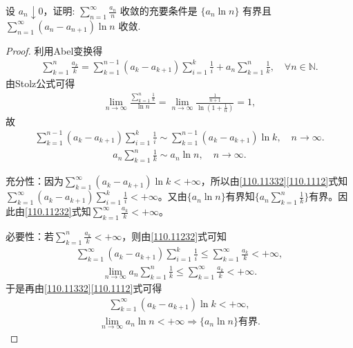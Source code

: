 \documentclass[../../main.tex]{subfiles}%
\begin{document}
\begin{example}
设 \( a_n \downarrow 0 \)，证明: \( \sum_{n=1}^{\infty} \frac{a_n}{n} \) 收敛的充要条件是 \( \{a_n \ln n\} \) 有界且 \( \sum_{n=1}^{\infty} (a_n - a_{n+1}) \ln n \) 收敛.
\end{example}
\begin{proof}
利用Abel变换得
\begin{align}
\sum_{k=1}^n{\frac{a_k}{k}}=\sum_{k=1}^{n-1}{\left( a_k-a_{k+1} \right) \sum_{i=1}^k{\frac{1}{i}}}+a_n\sum_{k=1}^n{\frac{1}{k}},\quad \forall n\in \mathbb{N} . \label{110.11232}
\end{align}
由Stolz公式可得
\begin{align*}
\lim_{n\rightarrow \infty}\frac{\sum\limits_{k=1}^n{\frac{1}{k}}}{\ln n}=\lim_{n\rightarrow \infty}\frac{\frac{1}{n+1}}{\ln \left( 1+\frac{1}{n} \right)}=1,
\end{align*}
故
\begin{align}
\sum_{k=1}^{n-1}{\left( a_k-a_{k+1} \right) \sum_{i=1}^k{\frac{1}{i}}}\sim \sum_{k=1}^{n-1}{\left( a_k-a_{k+1} \right) \ln k},\quad n\rightarrow \infty . \label{110.11332}
\end{align}
\begin{align}
a_n\sum_{k=1}^n{\frac{1}{k}}\sim a_n\ln n,\quad n\rightarrow \infty . \label{110.1112}
\end{align}

{\heiti 充分性}：因为$\sum_{k=1}^{\infty}{\left( a_k-a_{k+1} \right) \ln k}<+\infty$，所以由\eqref{110.11332}\eqref{110.1112}式知$\sum_{k=1}^{\infty}{\left( a_k-a_{k+1} \right) \sum_{i=1}^k{\frac{1}{i}}}<+\infty$。又由$\{ a_n\ln n \}$有界知$\{ a_n\sum_{k=1}^n{\frac{1}{k}} \}$有界。因此由\eqref{110.11232}式知$\sum_{k=1}^{\infty}{\frac{a_k}{k}}<+\infty$。

{\heiti 必要性}：若$\sum_{k=1}^n{\frac{a_k}{k}}<+\infty$，则由\eqref{110.11232}式可知
\begin{align*}
\sum_{k=1}^{\infty}{\left( a_k-a_{k+1} \right) \sum_{i=1}^k{\frac{1}{i}}}\leqslant \sum_{k=1}^{\infty}{\frac{a_k}{k}}<+\infty ,
\end{align*}
\begin{align*}
\lim_{n\rightarrow \infty}a_n\sum_{k=1}^n{\frac{1}{k}}\leqslant \sum_{k=1}^{\infty}{\frac{a_k}{k}}<+\infty .
\end{align*}
于是再由\eqref{110.11332}\eqref{110.1112}式可得
\begin{align*}
\sum_{k=1}^{\infty}{\left( a_k-a_{k+1} \right) \ln k}<+\infty ,
\end{align*}
\begin{align*}
\lim_{n\rightarrow \infty}a_n\ln n<+\infty \Longrightarrow \{ a_n\ln n \} \text{有界}.
\end{align*}
\end{proof}
\end{document}
